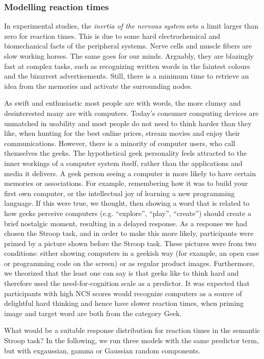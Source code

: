 \documentclass[]{svmono}
\begin{document}
\subsubsection{Modelling reaction times}\label{modelling-reaction-times}

In experimental studies, the \emph{inertia of the nervous system} sets a
limit larger than zero for reaction times. This is due to some hard
electrochemical and biomechanical facts of the peripheral systems. Nerve
cells and muscle fibers are slow working horses. The same goes for our
minds. Arguably, they are blazingly fast at complex tasks, such as
recognizing written words in the faintest colours and the bizarrest
advertisements. Still, there is a minimum time to retrieve an idea from
the memories and activate the surrounding nodes.

As swift and enthusiastic most people are with words, the more clumsy
and desinterested many are with computers. Today's consumer computing
devices are unmatched in usability and most people do not need to think
harder than they like, when hunting for the best online prices, stream
movies and enjoy their communications. However, there is a minority of
computer users, who call themselves the geeks. The hypothetical geek
personality feels attracted to the inner workings of a computer system
itself, rather than the applications and media it delivers. A geek
person seeing a computer is more likely to have certain memories or
associations. For example, remembering how it was to build your first
own computer, or the intellectual joy of learning a new programming
language. If this were true, we thought, then showing a word that is
related to how geeks perceive computers (e.g. ``explore'', ``play'',
``create'') should create a brief nostalgic moment, resulting in a
delayed response. As a response we had chosen the Stroop task, and in
order to make this more likely, participants were primed by a picture
shown before the Stroop task. These pictures were from two conditions:
either showing computers in a geekish way (for example, an open case or
programming code on the screen) or as regular product images.
Furthermore, we theorized that the least one can say is that geeks like
to think hard and therefore used the need-for-cognition scale as a
predictor. It was expected that participants with high NCS scores would
recognize computers as a source of delightful hard thinking and hence
have slower reaction times, when priming image and target word are both
from the category Geek.

What would be a suitable response distribution for reaction times in the
semantic Stroop task? In the following, we run three models with the
same predictor term, but with exgaussian, gamma or Gaussian random
components.
\end{document}
